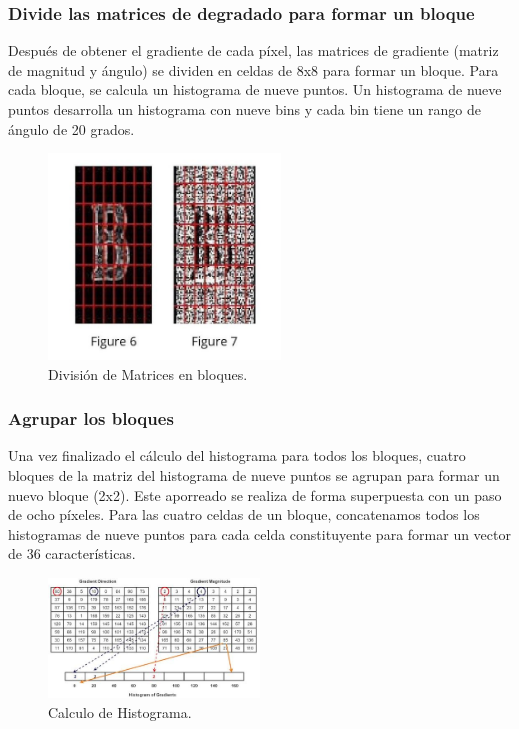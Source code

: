 \subsubsection{Divide las matrices de degradado para formar un bloque}
Después de obtener el gradiente de cada píxel, las matrices de gradiente (matriz de magnitud y ángulo) se dividen en celdas de 8x8 para formar un bloque. Para cada bloque, se calcula un histograma de nueve puntos. Un histograma de nueve puntos desarrolla un histograma con nueve bins y cada bin tiene un rango de ángulo de 20 grados.
\begin{figure}[H]
    \centering
    \includegraphics[width=0.55\textwidth]{2/2_teoria/figures/Hog3.jpeg} %
    \caption{División de Matrices en bloques.}
    \label{fig:etiqueta_imagen} %
\end{figure}

\subsubsection{Agrupar los bloques}
Una vez finalizado el cálculo del histograma para todos los bloques, cuatro bloques de la matriz del histograma de nueve puntos se agrupan para formar un nuevo bloque (2x2). Este aporreado se realiza de forma superpuesta con un paso de ocho píxeles. Para las cuatro celdas de un bloque, concatenamos todos los histogramas de nueve puntos para cada celda constituyente para formar un vector de 36 características.

\begin{figure}[H]
    \centering
    \includegraphics[width=0.50\textwidth]{2/2_teoria/figures/Hog4.jpg} %
    \caption{Calculo de Histograma.}
    \label{fig:etiqueta_imagen} %
\end{figure}

